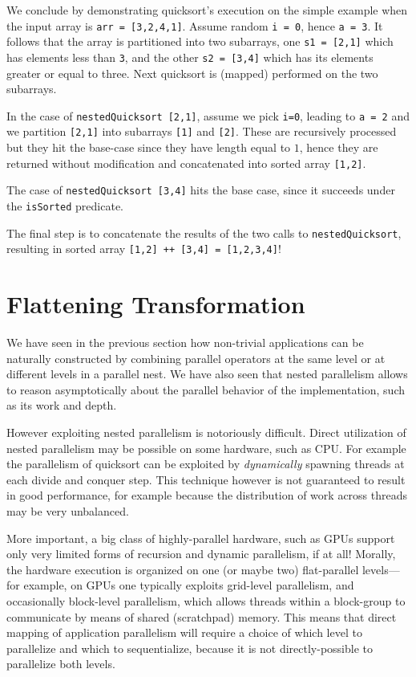 \documentclass[acmsmall,review]{acmart}\settopmatter{printfolios=true,printccs=false,printacmref=false}
\begin{document}
We conclude by demonstrating quicksort's execution on the simple example when
the input array is {\tt arr = [3,2,4,1]}. 
Assume random {\tt i = 0}, hence {\tt a = 3}. It follows that the array is 
partitioned into two subarrays, one {\tt s1 = [2,1]} which has elements less 
than {\tt 3}, and the other {\tt s2 = [3,4]} which has its elements greater
or equal to three. Next quicksort is (mapped) performed on the two subarrays.

In the case of {\tt nestedQuicksort [2,1]}, assume we pick {\tt i=0}, leading
to {\tt a = 2} and we partition {\tt [2,1]} into subarrays {\tt [1]} and {\tt [2]}.
These are recursively processed but they hit the base-case since they have length
equal to $1$, hence they are returned without modification and concatenated into
sorted array {\tt [1,2]}.

The case of {\tt nestedQuicksort [3,4]} hits the base case, since it succeeds
under the {\tt isSorted} predicate.

The final step is to concatenate the results of the two calls to {\tt nestedQuicksort},
resulting in sorted array {\tt [1,2] ++ [3,4] = [1,2,3,4]}!

\newpage
\section{Flattening Transformation}
\label{sec:flattening}

We have seen in the previous section how non-trivial applications
can be naturally constructed by combining parallel operators at the
same level or at different levels in a parallel nest. We have also
seen that nested parallelism allows to reason asymptotically about 
the parallel behavior of the implementation, such as its work and 
depth. 

However exploiting nested parallelism is notoriously difficult.
Direct utilization of nested parallelism may be possible on some
hardware, such as CPU. For example the parallelism of quicksort
can be exploited by \emph{dynamically} spawning threads at each
divide and conquer step. This technique however is not guaranteed
to result in good performance, for example because the distribution
of work across threads may be very unbalanced.

More important, a big class of highly-parallel hardware, such as
GPUs support only very limited forms of recursion and dynamic
parallelism, if at all! Morally, the hardware execution is organized 
on one (or maybe two) flat-parallel levels---for example, on GPUs 
one typically exploits grid-level parallelism, and occasionally
block-level parallelism, which allows threads within a block-group
to communicate by means of shared (scratchpad) memory. This means
that direct mapping of application parallelism will require a choice
of which level to parallelize and which to sequentialize, because 
it is not directly-possible to parallelize both levels. 
\end{document}
